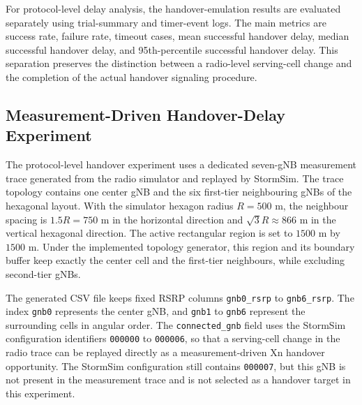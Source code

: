 For protocol-level delay analysis, the handover-emulation results are evaluated separately using trial-summary and timer-event logs. The main metrics are success rate, failure rate, timeout cases, mean successful handover delay, median successful handover delay, and 95th-percentile successful handover delay. This separation preserves the distinction between a radio-level serving-cell change and the completion of the actual handover signaling procedure.


\subsection{Measurement-Driven Handover-Delay Experiment}

The protocol-level handover experiment uses a dedicated seven-gNB measurement trace generated from the radio simulator and replayed by StormSim. The trace topology contains one center gNB and the six first-tier neighbouring gNBs of the hexagonal layout. With the simulator hexagon radius \(R=500\) m, the neighbour spacing is \(1.5R=750\) m in the horizontal direction and \(\sqrt{3}R\approx866\) m in the vertical hexagonal direction. The active rectangular region is set to \(1500\) m by \(1500\) m. Under the implemented topology generator, this region and its boundary buffer keep exactly the center cell and the first-tier neighbours, while excluding second-tier gNBs.

The generated CSV file keeps fixed RSRP columns \texttt{gnb0\_rsrp} to \texttt{gnb6\_rsrp}. The index \texttt{gnb0} represents the center gNB, and \texttt{gnb1} to \texttt{gnb6} represent the surrounding cells in angular order. The \texttt{connected\_gnb} field uses the StormSim configuration identifiers \texttt{000000} to \texttt{000006}, so that a serving-cell change in the radio trace can be replayed directly as a measurement-driven Xn handover opportunity. The StormSim configuration still contains \texttt{000007}, but this gNB is not present in the measurement trace and is not selected as a handover target in this experiment.

